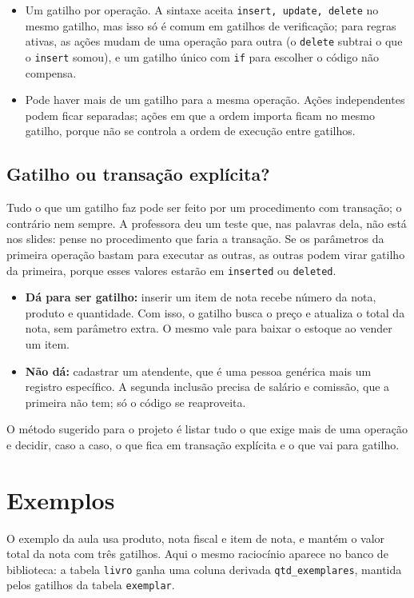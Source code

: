 \begin{itemize}
	\item Um gatilho por operação. A sintaxe aceita \texttt{insert,
	update, delete} no mesmo gatilho, mas isso só é comum em gatilhos de
	verificação; para regras ativas, as ações mudam de uma operação para
	outra (o \texttt{delete} subtrai o que o \texttt{insert} somou), e um
	gatilho único com \texttt{if} para escolher o código não compensa.
	\item Pode haver mais de um gatilho para a mesma operação. Ações
	independentes podem ficar separadas; ações em que a ordem importa
	ficam no mesmo gatilho, porque não se controla a ordem de execução
	entre gatilhos.
\end{itemize}

\subsection{Gatilho ou transação explícita?}

Tudo o que um gatilho faz pode ser feito por um procedimento com
transação; o contrário nem sempre. A professora deu um teste que, nas
palavras dela, não está nos slides: pense no procedimento que faria a
transação. Se os parâmetros da primeira operação bastam para executar
as outras, as outras podem virar gatilho da primeira, porque esses
valores estarão em \texttt{inserted} ou \texttt{deleted}.

\begin{itemize}
	\item \textbf{Dá para ser gatilho:} inserir um item de nota recebe
	número da nota, produto e quantidade. Com isso, o gatilho busca o
	preço e atualiza o total da nota, sem parâmetro extra. O mesmo vale
	para baixar o estoque ao vender um item.
	\item \textbf{Não dá:} cadastrar um atendente, que é uma pessoa
	genérica mais um registro específico. A segunda inclusão precisa de
	salário e comissão, que a primeira não tem; só o código se
	reaproveita.
\end{itemize}

O método sugerido para o projeto é listar tudo o que exige mais de uma
operação e decidir, caso a caso, o que fica em transação explícita e o
que vai para gatilho.

\section{Exemplos}

O exemplo da aula usa produto, nota fiscal e item de nota, e mantém o
valor total da nota com três gatilhos. Aqui o mesmo raciocínio aparece
no banco de biblioteca: a tabela \texttt{livro} ganha uma coluna
derivada \texttt{qtd\_exemplares}, mantida pelos gatilhos da tabela
\texttt{exemplar}.

